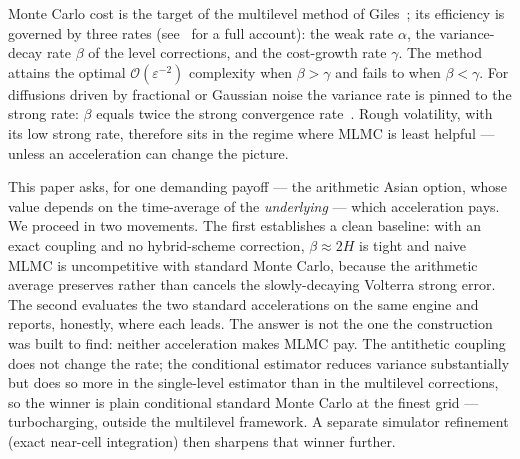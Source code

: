\documentclass[11pt]{article}
\begin{document}
Monte Carlo cost is the target of the multilevel method of Giles~\cite{giles2008}; 
its efficiency is governed by three rates (see~\cite{giles2015} for a full account):
the weak rate $\alpha$, the variance-decay rate
$\beta$ of the level corrections, and the cost-growth rate $\gamma$. The method attains
the optimal $\mathcal{O}(\varepsilon^{-2})$ complexity when $\beta>\gamma$ and fails to
when $\beta<\gamma$. For diffusions driven by fractional or Gaussian noise the variance
rate is pinned to the strong rate: $\beta$ equals twice the strong convergence
rate~\cite{bfrs2016}. Rough volatility, with its low strong rate, therefore sits in the
regime where MLMC is least helpful --- unless an acceleration can change the picture.

This paper asks, for one demanding payoff --- the arithmetic Asian option, whose value
depends on the time-average of the \emph{underlying} --- which acceleration pays. We
proceed in two movements. The first establishes a clean baseline: with an exact coupling
and no hybrid-scheme correction, $\beta\approx2H$ is tight and naive MLMC is
uncompetitive with standard Monte Carlo, because the arithmetic average preserves rather
than cancels the slowly-decaying Volterra strong error. The second evaluates the two
standard accelerations on the same engine and reports, honestly, where each leads. The
answer is not the one the construction was built to find: neither acceleration makes
MLMC pay. The antithetic coupling does not change the rate; the conditional estimator
reduces variance substantially but does so more in the single-level estimator than in
the multilevel corrections, so the winner is plain conditional standard Monte Carlo at
the finest grid --- turbocharging, outside the multilevel framework. A separate
simulator refinement (exact near-cell integration) then sharpens that winner further.
\end{document}
